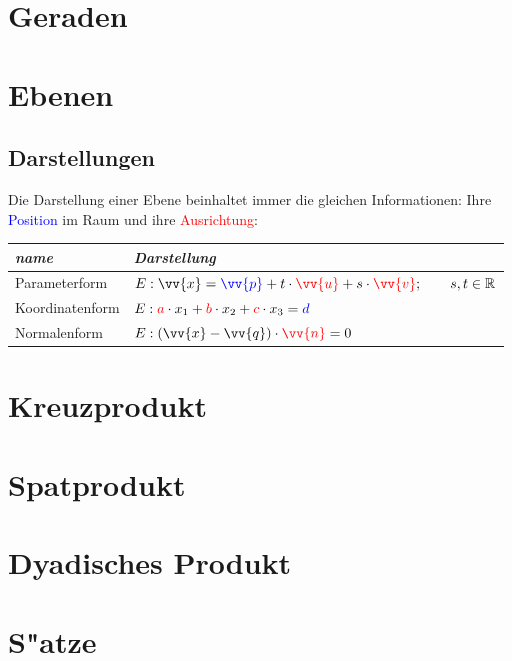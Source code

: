     \paragraph{} 

\section{Geraden}
\section{Ebenen}

\subsection{Darstellungen}

Die Darstellung einer Ebene beinhaltet immer die gleichen Informationen: Ihre \textcolor{blue}{Position} im Raum und ihre \textcolor{red}{Ausrichtung}:\\
\begin{center}
\begin{tabular}{@{} *2l @{}}
\emph{name} & \emph{Darstellung}   \\\midrule
 Parameterform \qquad \qquad \qquad \qquad \qquad & $E:\vv{x}=\textcolor{blue}{\vv{p}} + t\cdot \textcolor{red}{\vv{u}} + s\cdot \textcolor{red}{\vv{v}} ; \qquad s,t \in \R $    \\ 
 Koordinatenform \qquad \qquad \qquad \qquad \qquad & $E: \textcolor{red}{a} \cdot x_{1} + \textcolor{red}{b} \cdot x_{2} + \textcolor{red}{c} \cdot x_{3} = \textcolor{blue}{d}$ \\ 
 Normalenform \qquad \qquad \qquad \qquad \qquad & $E:(\vv{x} - \vv{q}) \cdot \textcolor{red}{\vv{n}} = 0 $\\

\end{tabular}
\end{center}


\section{Kreuzprodukt}
\section{Spatprodukt}
\section{Dyadisches Produkt}
\section{S"atze}

